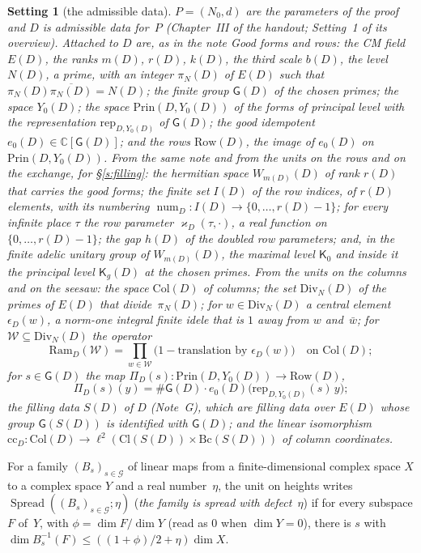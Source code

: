 \documentclass[11pt,a4paper]{article}
\newcommand{\m}[1]{\mbox{$#1$}}        %
\theoremstyle{plainx}
\theoremstyle{uprightx}
\newtheorem{setting}[theorem]{Setting}          %
\newcommand{\GRes}[1]{\mathsf{G}(#1)}               %
\newcommand{\Cl}[1]{\mathrm{Cl}(#1)}                %
\newcommand{\Bc}[1]{\mathrm{Bc}(#1)}                %
\newcommand{\SD}[1]{S(#1)}                          %
\newcommand{\Row}[1]{\mathrm{Row}(#1)}              %
\newcommand{\Col}[1]{\mathrm{Col}(#1)}              %
\newcommand{\Prin}[2]{\mathrm{Prin}(#1,#2)}         %
\newcommand{\prep}[2]{\mathrm{rep}_{#1,#2}}         %
\newcommand{\spaceY}[2]{Y_{#2}(#1)}                 %
\newcommand{\sGD}[1]{\mathsf{G}(#1)}                %
\newcommand{\gpt}[2]{\Pi_{#1}(#2)}                  %
\newcommand{\Ram}[2]{\mathrm{Ram}_{#1}(#2)}         %
\newcommand{\DivN}[1]{\mathrm{Div}_{N}(#1)}         %
\newcommand{\cgen}[2]{\epsilon_{#1}(#2)}            %
\newcommand{\ccoord}[1]{\mathrm{cc}_{#1}}           %
\newcommand{\spread}[2]{\operatorname{Spread}(#1;#2)} %
\newcommand{\CC}{\mathbb{C}}
\begin{document}
\begin{setting}[the admissible data]\label{s:D}
\m{P=(N_0,d)} are the parameters of the proof and $D$ is admissible data for~$P$ (Chapter~III of the handout;
Setting~1 of its overview). Attached to $D$ are, as in the note \emph{Good forms and rows}: the CM field
\m{E(D)}, the ranks \m{m(D)}, \m{r(D)}, \m{k(D)}, the third scale \m{b(D)}, the level \m{N(D)}, a prime, with an
integer \m{\pi_N(D)} of \m{E(D)} such that \m{\pi_N(D)\overline{\pi_N(D)}=N(D)}; the finite group \m{\sGD{D}} of
the chosen primes; the space \m{\spaceY{D}{0}}; the space \m{\Prin{D}{\spaceY{D}{0}}} of the forms of principal
level with the representation \m{\prep{D}{\spaceY{D}{0}}} of \m{\sGD{D}}; the good idempotent
\m{e_0(D)\in\CC[\sGD{D}]}; and the rows \m{\Row{D}}, the image of \m{e_0(D)} on \m{\Prin{D}{\spaceY{D}{0}}}.
From the same note and from the units on the rows and on the exchange, for §\ref{s:filling}: the hermitian
space \m{W_{m(D)}(D)} of rank \m{r(D)} that carries the good forms; the finite set \m{I(D)} of the row indices,
of \m{r(D)} elements, with its numbering \m{\operatorname{num}_D\colon I(D)\to\{0,\dots,r(D)-1\}}; for every
infinite place $\tau$ the row parameter \m{\varkappa_D(\tau,\cdot)}, a real function on \m{\{0,\dots,r(D)-1\}};
the gap \m{h(D)} of the doubled row parameters; and, in the finite adelic unitary group of \m{W_{m(D)}(D)}, the
maximal level $\mathsf{K}_0$ and inside it the principal level \m{\mathsf{K}_g(D)} at the chosen primes.
From the units on the columns and on the seesaw: the space \m{\Col{D}} of columns; the set \m{\DivN{D}} of the
primes of \m{E(D)} that divide~\m{\pi_N(D)}; for \m{w\in\DivN{D}} a central element \m{\cgen{D}{w}}, a norm-one
integral finite idele that is $1$ away from $w$ and~$\bar w$; for \m{\mathcal W\subseteq\DivN{D}} the operator
\[\Ram{D}{\mathcal W}=\prod_{w\in\mathcal W}\bigl(1-\text{translation by }\cgen{D}{w}\bigr)\quad\text{on }\Col{D};\]
for \m{s\in\sGD{D}} the map $\gpt{D}{s}\colon\Prin{D}{\spaceY{D}{0}}\to\Row{D}$,
\[\gpt{D}{s}(y)=\#\sGD{D}\cdot e_0(D)\bigl(\prep{D}{\spaceY{D}{0}}(s)\,y\bigr);\]
the filling data \m{\SD{D}} of $D$
(Note~G), which are filling data over \m{E(D)} whose group \m{\GRes{\SD{D}}} is identified with \m{\sGD{D}}; and
the linear isomorphism $\ccoord{D}\colon\Col{D}\to\ell^2(\Cl{\SD{D}}\times\Bc{\SD{D}})$ of column coordinates.
\end{setting}

For a family \m{(B_s)_{s\in\mathcal G}} of linear maps from a finite-dimensional complex space $X$ to a complex
space $Y$ and a real number~$\eta$, the unit on heights writes \m{\spread{(B_s)_{s\in\mathcal G}}{\eta}} (\emph{the
family is spread with defect~$\eta$}) if for every subspace $F$ of~$Y$, with \m{\phi=\dim F/\dim Y} (read as $0$
when \m{\dim Y=0}), there is $s$ with \m{\dim B_s^{-1}(F)\le((1+\phi)/2+\eta)\dim X}.
\end{document}

